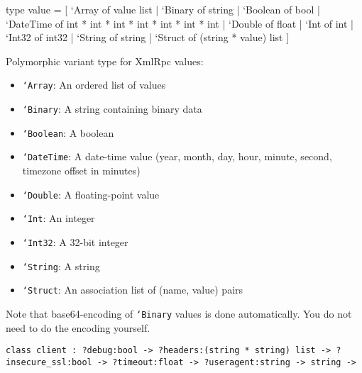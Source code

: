 \documentclass[11pt]{article}
\begin{document}
\label{type:XmlRpc.value}\begin{ocamldoccode}
type value = [ `Array of value list
  | `Binary of string
  | `Boolean of bool
  | `DateTime of int * int * int * int * int * int * int
  | `Double of float
  | `Int of int
  | `Int32 of int32
  | `String of string
  | `Struct of (string * value) list ] 
\end{ocamldoccode}
\begin{ocamldocdescription}
Polymorphic variant type for XmlRpc values:\begin{itemize}
\item {\tt{`Array}}: An ordered list of values
\item {\tt{`Binary}}: A string containing binary data
\item {\tt{`Boolean}}: A boolean
\item {\tt{`DateTime}}: A date-time value
      (year, month, day, hour, minute, second, timezone offset in minutes)
\item {\tt{`Double}}: A floating-point value
\item {\tt{`Int}}: An integer
\item {\tt{`Int32}}: A 32-bit integer
\item {\tt{`String}}: A string
\item {\tt{`Struct}}: An association list of (name, value) pairs
\end{itemize}

    Note that base64-encoding of {\tt{`Binary}} values is done automatically.
    You do not need to do the encoding yourself.


\end{ocamldocdescription}




\begin{ocamldoccode}
{\tt{class client : }}{\tt{?debug:bool -> ?headers:(string * string) list -> ?insecure\_ssl:bool -> ?timeout:float -> ?useragent:string -> string -> }}\end{ocamldoccode}
\label{class:XmlRpc.client}
\end{document}
